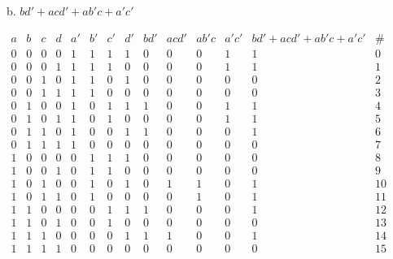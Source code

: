 \documentclass[12pt]{book}
\newenvironment{indented}[1] {
	\begin{list}{}{\setlength{\leftmargin}{#1}}
		\item[]
	}{\end{list}}
\begin{document}
\begin{indented}{5mm}
		b. $bd' + acd' + ab'c + a'c'$
		\begin{indented}{5mm}
			$\begin{array}{c|c|c|c||c|c|c|c||c|c|c|c||c|c}
				a & b & c & d & a' & b' & c' & d' & bd' & acd' & ab'c & a'c' & bd' + acd' + ab'c + a'c' & \#  \\
				\hline
				0 & 0 & 0 & 0 & 1  & 1  & 1  & 1  &  0  &  0   &  0   &  1   &            1            &  0  \\
				0 & 0 & 0 & 1 & 1  & 1  & 1  & 0  &  0  &  0   &  0   &  1   &            1            &  1  \\
				0 & 0 & 1 & 0 & 1  & 1  & 0  & 1  &  0  &  0   &  0   &  0   &            0            &  2  \\
				0 & 0 & 1 & 1 & 1  & 1  & 0  & 0  &  0  &  0   &  0   &  0   &            0            &  3  \\
				0 & 1 & 0 & 0 & 1  & 0  & 1  & 1  &  1  &  0   &  0   &  1   &            1            &  4  \\
				0 & 1 & 0 & 1 & 1  & 0  & 1  & 0  &  0  &  0   &  0   &  1   &            1            &  5  \\
				0 & 1 & 1 & 0 & 1  & 0  & 0  & 1  &  1  &  0   &  0   &  0   &            1            &  6  \\
				0 & 1 & 1 & 1 & 1  & 0  & 0  & 0  &  0  &  0   &  0   &  0   &            0            &  7  \\
				1 & 0 & 0 & 0 & 0  & 1  & 1  & 1  &  0  &  0   &  0   &  0   &            0            &  8  \\
				1 & 0 & 0 & 1 & 0  & 1  & 1  & 0  &  0  &  0   &  0   &  0   &            0            &  9  \\
				1 & 0 & 1 & 0 & 0  & 1  & 0  & 1  &  0  &  1   &  1   &  0   &            1            &  10 \\
				1 & 0 & 1 & 1 & 0  & 1  & 0  & 0  &  0  &  0   &  1   &  0   &            1            &  11 \\
				1 & 1 & 0 & 0 & 0  & 0  & 1  & 1  &  1  &  0   &  0   &  0   &            1            &  12 \\
				1 & 1 & 0 & 1 & 0  & 0  & 1  & 0  &  0  &  0   &  0   &  0   &            0            &  13 \\
				1 & 1 & 1 & 0 & 0  & 0  & 0  & 1  &  1  &  1   &  0   &  0   &            1            &  14 \\
				1 & 1 & 1 & 1 & 0  & 0  & 0  & 0  &  0  &  0   &  0   &  0   &            0            &  15 \\
			\end{array}$


\end{indented}
\end{indented}
\end{document}
